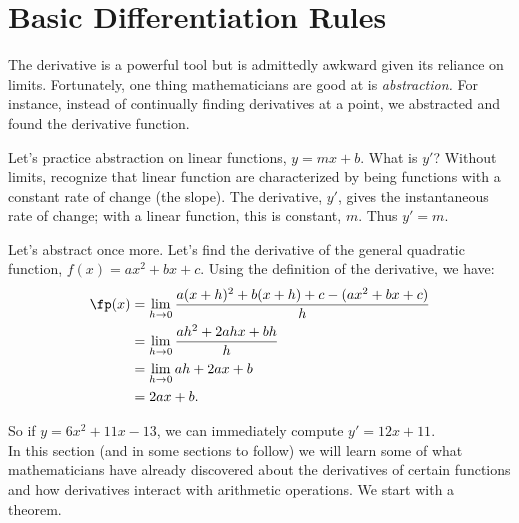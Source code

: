 \section{Basic Differentiation Rules}\label{sec:basic_diff_rules}

The derivative is a powerful tool but is admittedly awkward given its reliance on limits. Fortunately, one thing mathematicians are good at is \textit{abstraction.} For instance, instead of continually finding derivatives at a point, we abstracted and found the derivative function. 

Let's practice abstraction on linear functions, $y=mx+b$. What is $y'$? Without limits, recognize that linear function are characterized by being functions with a constant rate of change (the slope). The derivative, $y'$, gives the instantaneous rate of change; with a linear function, this is constant, $m$. Thus $y'=m$. 

Let's abstract once more. Let's find the derivative of the general quadratic function, $f(x) = ax^2+bx+c$. Using the definition of the derivative, we have:
		\begin{align*}
		\fp(x) 	&=	\lim_{h\to 0}\frac{a(x+h)^2+b(x+h)+c-(ax^2+bx+c)}{h} \\
						&=	\lim_{h\to 0} \frac{ah^2+2ahx+bh}{h} \\
						&=	\lim_{h\to 0} ah+2ax+b\\
						&= 2ax+b.
		\end{align*}
		
So if $y = 6x^2+11x-13$, we can immediately compute $y' = 12x+11$. \\

In this section (and in some sections to follow) we will learn some of what mathematicians have already discovered about the derivatives of certain functions and how derivatives interact with arithmetic operations. We start with a theorem.

